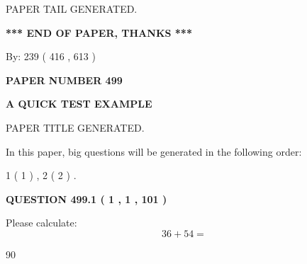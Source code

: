 \documentclass[12pt]{article}
\begin{document}
   
   
   
   
   
 \vspace{0.2in}
 
   
   
\vspace{2.0in} PAPER TAIL GENERATED.
   
   
   
   
\vspace{1.0in} 
{\textbf{\large{ *** END OF PAPER, THANKS *** }}} 
   
   
\hspace{1.0in} By: 
 239 ( 416 ,  613 )
   
   
   
   
\newpage 
\setcounter{page}{ 
   499001 } 
   
   
   
   
 {\textbf{ \Large{ PAPER NUMBER  499  }}}
   
   
\vspace{0.2in}
   
   
   
   
   
   
   
   
 \vspace{0.2in}
{\LARGE {\textbf{ A QUICK TEST EXAMPLE}}}
   
   
 PAPER TITLE GENERATED.
   
   
   
\vspace{0.2in}
   
In this paper, big questions will be generated in the following order: 
   
   
   1 ( 1 )
 ,
   2 ( 2 )
 .
  
\vspace{0.2in}
  
{\textbf{\Large{QUESTION
499.1 
 ( 1 , 1 , 101 )
}}}
  
  
 
Please calculate:
\begin{equation}
36 +  %
54 = \nonumber
\end{equation}
 
 
 
\noindent{}
 
 

90
 
\end{document}
